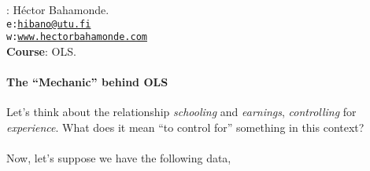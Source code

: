 \documentclass[10pt]{article}
\begin{document}


\thispagestyle{fancy} %





\hspace{-5mm}{\bf Professor}: H\'ector Bahamonde.\\
\texttt{e:}\href{mailto:hibano@utu.fi}{\texttt{hibano@utu.fi}}\\
\texttt{w:}\href{http://www.hectorbahamonde.com}{\texttt{www.hectorbahamonde.com}}\\
{\bf Course}: OLS.


\paragraph{The ``Mechanic'' behind OLS} Let's think about the relationship \emph{schooling} and \emph{earnings}, \emph{controlling} for \emph{experience}. What does it mean ``to control for'' something in this context? 
\\
\\
Now, let's suppose we have the following data,
\end{document}

